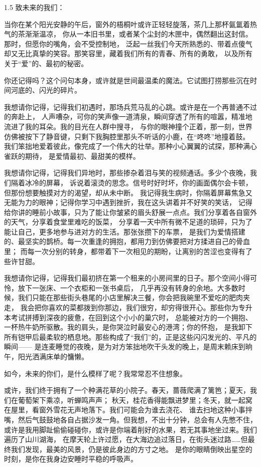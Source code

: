 \large
\begin{spacing}{1.5}
    \noindent 致未来的我们：

    当你在某个阳光安静的午后，窗外的梧桐叶或许正轻轻旋落，茶几上那杯氤氲着热气的茶渐渐温凉，
    你从一本旧书里，或者某个尘封的木匣中，偶然翻出这封信。那时，但愿你的嘴角，会不受控制地，
    泛起一丝我们今天所熟悉的、带着点傻气却又无比真挚的笑容。那笑容里，藏着我们所有的青春、所有的勇敢，
    以及所有关于“爱”的、最初的秘密。

    你还记得吗？这个问句本身，或许就是世间最温柔的魔法。它试图打捞那些沉在时间河底的、闪光的碎片。

    我想请你记得，记得我们初遇时，那场兵荒马乱的心跳。或许是在一个再普通不过的奔赴上，
    人声嘈杂，可你的笑声像一道清泉，瞬间穿透了所有的喧嚣，精准地流进了我的耳朵。我的目光在人群中搜寻，
    与你的眼神撞个正着，那一刻，世界仿佛被按下了静音键，只剩下我胸腔里那头不听话的小鹿，在“咚咚”地撞着鼓。
    我们笨拙地爱着彼此，像完成了一个伟大的壮举。那种小心翼翼的试探，那种满心雀跃的期待，
    是爱情最初、最甜美的模样。

    我想请你记得，记得我们异地时，那些掺杂着泪与笑的视频通话。多少个夜晚，我们隔着冰冷的屏幕，
    诉说着滚烫的思念。信号时好时坏，你的画面偶尔会卡顿，但那份想要触摸对方的渴望，却从未中断。
    我记得我生病时，你隔着屏幕焦急又无能为力的眼神；记得你学习中遇到挫折，我在这头讲着并不好笑的笑话，
    记得给你讲的睡前小故事，只为了能让你皱紧的眉头舒展一点点。我们分享着各自窗外的天气，分享着食堂里难吃的饭菜，
    分享着一天中所有微不足道的琐碎，只为了能让自己，更多地参与进对方的生活。那张张攒下的车票，
    是我们为爱情搭建的、最坚实的鹊桥。每一次重逢的拥抱，都用力到仿佛要把对方揉进自己的骨血里；
    而每一次分别的转身，都带着下一次相见的期盼，让离别的苦涩也变得有了些许甘甜。

    我想请你记得，记得我们最初挤在第一个租来的小房间里的日子。那个空间小得可怜，放下一张床、一个衣柜和一张书桌后，
    几乎再没有转身的余地。大多数时候，我们只能在那些街头巷尾的小店里解决三餐，你会把我碗里不爱吃的肥肉夹走，
    我会把你喜欢的菜都拨到你那边，我们很穷，却穷得很开心。那些你为专升本考试拼搏到深夜的疲惫，在回到这个小小的巢穴时，
    总能被对方的一个拥抱、一杯热牛奶所驱散。我的肩头，是你哭泣时最安心的港湾；你的怀抱，
    是我卸下所有铠甲后最柔软的栖息地。那些构成了“我们”的，正是这些闪闪发光的、平凡的瞬间——
    是连麦睡觉的夜晚，是为对方笨拙地吹干头发的晚上，是周末赖床到晌午，阳光洒满床单的慵懒。

    如今，未来的你们，是什么模样了呢？我常常忍不住想象。

    或许，我们终于拥有了一个种满花草的小院子。春天，蔷薇爬满了篱笆；夏天，我们在葡萄架下乘凉，听蝉鸣声声；
    秋天，桂花香得能飘进梦里；冬天，就一起窝在屋里，看窗外雪花无声地落下。我们可能会为谁去浇花、
    谁去扫地这种小事拌嘴，然后气鼓鼓地各自占据沙发一角。但我想，不出十分钟，总会有人先憋不住，
    或许是我用脚趾偷偷碰碰你，或许是你端着削好的水果，若无其事地坐过来。我们遍历了山川湖海，
    在摩天轮上许过愿，在大海边追过落日，在街头迷过路……但最终我们发现，最美的风景，仍是彼此身边的方寸之地。
    是你的眼睛倒映出星空的时刻，是你在我身边安睡时平稳的呼吸声。


\end{spacing}
